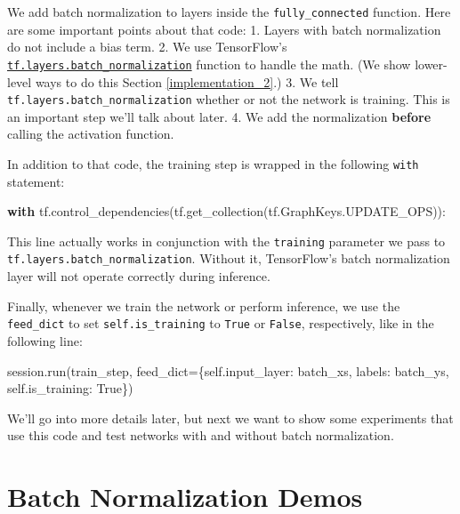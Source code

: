 \documentclass[11pt]{article}
\newenvironment{Shaded}{}{}
\newcommand{\NormalTok}[1]{{#1}}
\newcommand{\VariableTok}[1]{\textcolor[rgb]{0.10,0.09,0.49}{{#1}}}
\newcommand{\ControlFlowTok}[1]{\textcolor[rgb]{0.00,0.44,0.13}{\textbf{{#1}}}}
\newcommand{\OperatorTok}[1]{\textcolor[rgb]{0.40,0.40,0.40}{{#1}}}
\begin{document}
We add batch normalization to layers inside the
\texttt{fully\_connected} function. Here are some important points about
that code: 1. Layers with batch normalization do not include a bias
term. 2. We use TensorFlow's
\href{https://www.tensorflow.org/api_docs/python/tf/layers/batch_normalization}{\texttt{tf.layers.batch\_normalization}}
function to handle the math. (We show lower-level ways to do this
Section \ref{implementation_2}.) 3. We tell
\texttt{tf.layers.batch\_normalization} whether or not the network is
training. This is an important step we'll talk about later. 4. We add
the normalization \textbf{before} calling the activation function.

In addition to that code, the training step is wrapped in the following
\texttt{with} statement:

\begin{Shaded}
\begin{Highlighting}[]
\ControlFlowTok{with}\NormalTok{ tf.control_dependencies(tf.get_collection(tf.GraphKeys.UPDATE_OPS)):}
\end{Highlighting}
\end{Shaded}

This line actually works in conjunction with the \texttt{training}
parameter we pass to \texttt{tf.layers.batch\_normalization}. Without
it, TensorFlow's batch normalization layer will not operate correctly
during inference.

Finally, whenever we train the network or perform inference, we use the
\texttt{feed\_dict} to set \texttt{self.is\_training} to \texttt{True}
or \texttt{False}, respectively, like in the following line:

\begin{Shaded}
\begin{Highlighting}[]
\NormalTok{session.run(train_step, feed_dict}\OperatorTok{=}\NormalTok{\{}\VariableTok{self}\NormalTok{.input_layer: batch_xs, }
\NormalTok{                                               labels: batch_ys, }
                                               \VariableTok{self}\NormalTok{.is_training: }\VariableTok{True}\NormalTok{\})}
\end{Highlighting}
\end{Shaded}

We'll go into more details later, but next we want to show some
experiments that use this code and test networks with and without batch
normalization.

    \hypertarget{batch-normalization-demos}{%
\section{Batch Normalization Demos}\label{batch-normalization-demos}}
\end{document}
